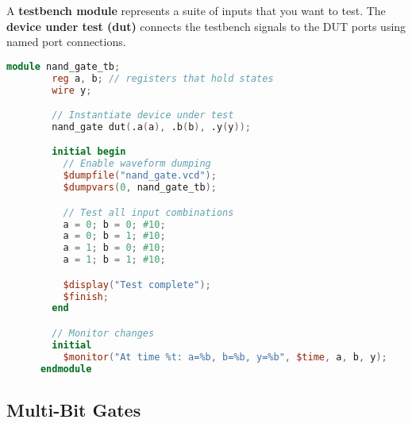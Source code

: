   \begin{definition}
    A \textbf{testbench module} represents a suite of inputs that you want to test. The \textbf{device under test (dut)} connects the testbench signals to the DUT ports using named port connections. 

    \begin{lstlisting}[language=Verilog]
      module nand_gate_tb;
        reg a, b; // registers that hold states
        wire y;

        // Instantiate device under test
        nand_gate dut(.a(a), .b(b), .y(y));

        initial begin
          // Enable waveform dumping
          $dumpfile("nand_gate.vcd");
          $dumpvars(0, nand_gate_tb);

          // Test all input combinations
          a = 0; b = 0; #10;
          a = 0; b = 1; #10;
          a = 1; b = 0; #10;
          a = 1; b = 1; #10;

          $display("Test complete");
          $finish;
        end

        // Monitor changes
        initial
          $monitor("At time %t: a=%b, b=%b, y=%b", $time, a, b, y);
      endmodule
    \end{lstlisting}
  \end{definition}

\subsection{Multi-Bit Gates}

  \begin{definition}
    
  \end{definition}

  \begin{definition}
    
  \end{definition}

  \begin{definition}
    
  \end{definition}

  \begin{definition}
    
  \end{definition}

  \begin{definition}
    
  \end{definition}

  \begin{definition}
    
  \end{definition}

  \begin{definition}
    
  \end{definition}


